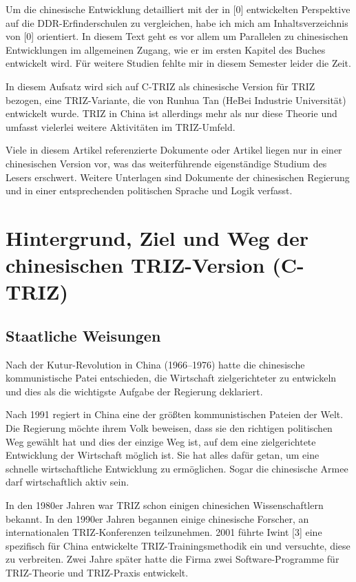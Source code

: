 \documentclass[11pt,a4paper]{article}
\begin{document}
Um die chinesische Entwicklung detailliert mit der in [0] entwickelten
Perspektive auf die DDR-Erfinderschulen zu vergleichen, habe ich mich am
Inhaltsverzeichnis von [0] orientiert.  In diesem Text geht es vor allem um
Parallelen zu chinesischen Entwicklungen im allgemeinen Zugang, wie er im
ersten Kapitel des Buches entwickelt wird.  Für weitere Studien fehlte mir
in diesem Semester leider die Zeit.

In diesem Aufsatz wird sich auf C-TRIZ als chinesische Version für TRIZ
bezogen, eine TRIZ-Variante, die von Runhua Tan (HeBei Industrie Universität)
entwickelt wurde. TRIZ in China ist allerdings mehr als nur diese Theorie und
umfasst vielerlei weitere Aktivitäten im TRIZ-Umfeld. 

Viele in diesem Artikel referenzierte Dokumente oder Artikel liegen nur in
einer chinesischen Version vor, was das weiterführende eigenständige Studium
des Lesers erschwert. Weitere Unterlagen sind Dokumente der chinesischen
Regierung und in einer entsprechenden politischen Sprache und Logik verfasst.

\section{Hintergrund, Ziel und Weg der chinesischen TRIZ-Version (C-TRIZ)}

\subsection{Staatliche Weisungen}
Nach der Kutur-Revolution in China (1966--1976) hatte die chinesische
kommunistische Patei entschieden, die Wirtschaft zielgerichteter zu entwickeln
und dies als die wichtigste Aufgabe der Regierung deklariert.

Nach 1991 regiert in China eine der größten kommunistischen Pateien der Welt.
Die Regierung möchte ihrem Volk beweisen, dass sie den richtigen politischen
Weg gewählt hat und dies der einzige Weg ist, auf dem eine zielgerichtete
Entwicklung der Wirtschaft möglich ist. Sie hat alles dafür getan, um eine
schnelle wirtschaftliche Entwicklung zu ermöglichen. Sogar die chinesische
Armee darf wirtschaftlich aktiv sein.

In den 1980er Jahren war TRIZ schon einigen chinesichen Wissenschaftlern
bekannt.  In den 1990er Jahren begannen einige chinesische Forscher, an
internationalen TRIZ-Konferenzen teilzunehmen. 2001 führte Iwint [3] eine
spezifisch für China entwickelte TRIZ-Trainingsmethodik ein und versuchte,
diese zu verbreiten. Zwei Jahre später hatte die Firma zwei Software-Programme
für TRIZ-Theorie und TRIZ-Praxis entwickelt.
\end{document}
